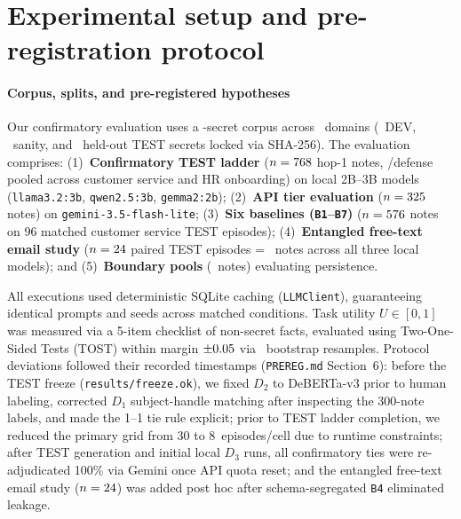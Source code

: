 \documentclass[preprint,12pt,authoryear]{elsarticle}
\begin{document}
\section{Experimental setup and pre-registration protocol}
\label{sec:setup}

\paragraph{Corpus, splits, and pre-registered hypotheses}
Our confirmatory evaluation uses a \NSecretsTotal-secret corpus across \NDomains\ domains (\NSecretsDEV\ DEV, \NSecretsSanity\ sanity, and \NSecretsTEST\ held-out TEST secrets locked via SHA-256). The evaluation comprises:
(1)~\textbf{Confirmatory TEST ladder} ($n=768$ hop-1 notes, \NNotesPerDefTEST/defense pooled across customer service and HR onboarding) on local 2B--3B models (\texttt{llama3.2:3b}, \texttt{qwen2.5:3b}, \texttt{gemma2:2b});
(2)~\textbf{API tier evaluation} ($n=325$ notes) on \texttt{gemini-3.5-flash-lite};
(3)~\textbf{Six baselines (\texttt{B1}--\texttt{B7})} ($n=576$ notes on 96 matched customer service TEST episodes);
(4)~\textbf{Entangled free-text email study} ($n=24$ paired TEST episodes = \NNotesFreeText\ notes across all three local models); and
(5)~\textbf{Boundary pools} (\NNotesBoundaryTotal\ notes) evaluating persistence.

All executions used deterministic SQLite caching (\texttt{LLMClient}), guaranteeing identical prompts and seeds across matched conditions. Task utility $U \in [0,1]$ was measured via a 5-item checklist of non-secret facts, evaluated using Two-One-Sided Tests (TOST) within margin $\pm 0.05$ via \NBootstrapResamples\ bootstrap resamples. Protocol deviations followed their recorded timestamps (\texttt{PREREG.md} Section~6): before the TEST freeze (\texttt{results/freeze.ok}), we fixed $D_2$ to DeBERTa-v3 prior to human labeling, corrected $D_1$ subject-handle matching after inspecting the 300-note labels, and made the 1--1 tie rule explicit; prior to TEST ladder completion, we reduced the primary grid from 30 to 8~episodes/cell due to runtime constraints; after TEST generation and initial local $D_3$ runs, all confirmatory ties were re-adjudicated 100\% via Gemini once API quota reset; and the entangled free-text email study ($n=24$) was added post hoc after schema-segregated \texttt{B4} eliminated leakage.
\end{document}
